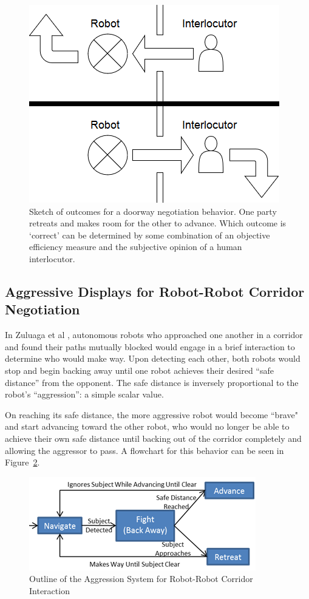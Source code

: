 \documentclass[letterpaper, 10 pt, conference]{ieeeconf}  %
\begin{document}
    \begin{figure}
      \centering
      \includegraphics[width=0.6\columnwidth]{wireframe.png}
      \caption{Sketch of outcomes for a doorway negotiation behavior. One party retreats and makes room for the other to advance. Which outcome is `correct' can be determined by some combination of an objective efficiency measure and the subjective opinion of a human interlocutor.}
      \label{fig:Wireframe}
   \end{figure}

\subsection{Aggressive Displays for Robot-Robot Corridor Negotiation}

In Zuluaga et al \cite{zuluaga2005reducing}, autonomous robots who approached one another in a corridor and found their paths mutually blocked would engage in a brief interaction to determine who would make way. Upon detecting each other, both robots would stop and begin backing away until one robot achieves their desired ``safe distance'' from the opponent. The safe distance is inversely proportional to the robot's ``aggression'': a simple scalar value.

On reaching its safe distance, the more aggressive robot would become ``brave" and start advancing toward the other robot, who would no longer be able to achieve their own safe distance until backing out of the corridor completely and allowing the aggressor to pass. A flowchart for this behavior can be seen in Figure~\ref{fig:Aggressive}.
 
    \begin{figure}
      \centering
      \includegraphics{aggressive_behavior.png}
      \caption{Outline of the Aggression System for Robot-Robot Corridor Interaction}
      \label{fig:Aggressive}
   \end{figure}
 
\end{document}
